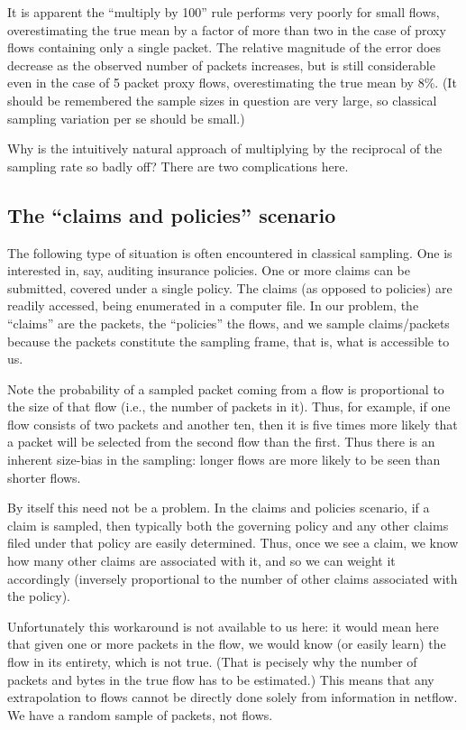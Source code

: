 \documentclass{paper}
\begin{document}
It is apparent the ``multiply by 100'' rule performs very poorly for small
flows, overestimating the true mean by a factor of more than two in the case of
proxy flows containing only a single packet. The relative magnitude of the error
does decrease as the observed number of packets increases, but is still
considerable even in the case of 5 packet proxy flows, overestimating the true
mean by 8\%. (It should be remembered the sample sizes in question are very
large, so classical sampling variation per se should be small.)

Why is the intuitively natural approach of multiplying by the reciprocal of the
sampling rate so badly off? There are two complications here.

\subsection{The ``claims and policies'' scenario}

The following type of situation is often encountered in classical sampling.  One
is interested in, say, auditing insurance policies. One or more claims can be
submitted, covered under a single policy. The claims (as opposed to policies)
are readily accessed, being enumerated in a computer file. In our problem, the
``claims'' are the packets, the ``policies'' the flows, and we sample
claims/packets because the packets constitute the sampling frame, that is, what
is accessible to us.

Note the probability of a sampled packet coming from a flow is proportional to
the size of that flow (i.e., the number of packets in it). Thus, for example, if
one flow consists of two packets and another ten, then it is five times more
likely that a packet will be selected from the second flow than the first. Thus
there is an inherent size-bias in the sampling: longer flows are more likely to
be seen than shorter flows.

By itself this need not be a problem. In the claims and policies scenario, if a
claim is sampled, then typically both the governing policy and any other claims
filed under that policy are easily determined. Thus, once we see a claim, we
know how many other claims are associated with it, and so we can weight it
accordingly (inversely proportional to the number of other claims associated
with the policy).

Unfortunately this workaround is not available to us here: it would mean here
that given one or more packets in the flow, we would know (or easily learn) the
flow in its entirety, which is not true. (That is pecisely why the number of
packets and bytes in the true flow has to be estimated.) This means that any
extrapolation to flows cannot be directly done solely from information in
netflow. We have a random sample of packets, not flows.
\end{document}
